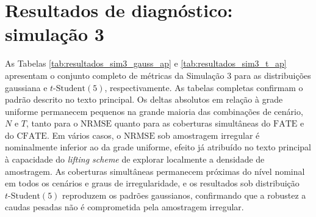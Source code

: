 \section{Resultados de diagnóstico: simulação 3}\label{ap-sim3-completa}

As Tabelas \ref{tab:resultados_sim3_gauss_ap} e \ref{tab:resultados_sim3_t_ap} apresentam o conjunto completo de métricas da Simulação 3 para as distribuições gaussiana e \(t\text{-Student}(5)\), respectivamente. As tabelas completas confirmam o padrão descrito no texto principal. Os deltas absolutos em relação à grade uniforme permanecem pequenos na grande maioria das combinações de cenário, \(N\) e \(T\), tanto para o \(\mathrm{NRMSE}\) quanto para as coberturas simultâneas do \(\mathrm{FATE}\) e do \(\mathrm{CFATE}\). Em vários casos, o \(\mathrm{NRMSE}\) sob amostragem irregular é nominalmente inferior ao da grade uniforme, efeito já atribuído no texto principal à capacidade do \emph{lifting scheme} de explorar localmente a densidade de amostragem. As coberturas simultâneas permanecem próximas do nível nominal em todos os cenários e graus de irregularidade, e os resultados sob distribuição \(t\text{-Student}(5)\) reproduzem os padrões gaussianos, confirmando que a robustez a caudas pesadas não é comprometida pela amostragem irregular.

